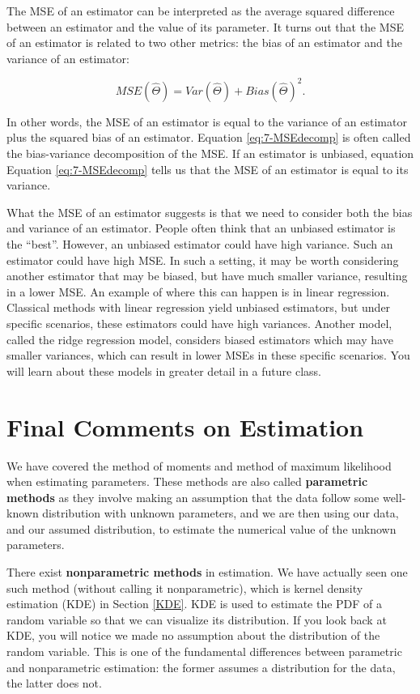 \documentclass[
]{book}
\begin{document}
The MSE of an estimator can be interpreted as the average squared difference between an estimator and the value of its parameter. It turns out that the MSE of an estimator is related to two other metrics: the bias of an estimator and the variance of an estimator:

\begin{equation} 
MSE(\hat{\Theta}) = Var(\hat{\Theta}) + Bias(\hat{\Theta})^2.
\label{eq:7-MSEdecomp}
\end{equation}

In other words, the MSE of an estimator is equal to the variance of an estimator plus the squared bias of an estimator. Equation \eqref{eq:7-MSEdecomp} is often called the bias-variance decomposition of the MSE. If an estimator is unbiased, equation Equation \eqref{eq:7-MSEdecomp} tells us that the MSE of an estimator is equal to its variance.

What the MSE of an estimator suggests is that we need to consider both the bias and variance of an estimator. People often think that an unbiased estimator is the ``best''. However, an unbiased estimator could have high variance. Such an estimator could have high MSE. In such a setting, it may be worth considering another estimator that may be biased, but have much smaller variance, resulting in a lower MSE. An example of where this can happen is in linear regression. Classical methods with linear regression yield unbiased estimators, but under specific scenarios, these estimators could have high variances. Another model, called the ridge regression model, considers biased estimators which may have smaller variances, which can result in lower MSEs in these specific scenarios. You will learn about these models in greater detail in a future class.

\hypertarget{estcomments}{%
\section{Final Comments on Estimation}\label{estcomments}}

We have covered the method of moments and method of maximum likelihood when estimating parameters. These methods are also called \textbf{parametric methods} as they involve making an assumption that the data follow some well-known distribution with unknown parameters, and we are then using our data, and our assumed distribution, to estimate the numerical value of the unknown parameters.

There exist \textbf{nonparametric methods} in estimation. We have actually seen one such method (without calling it nonparametric), which is kernel density estimation (KDE) in Section \ref{KDE}. KDE is used to estimate the PDF of a random variable so that we can visualize its distribution. If you look back at KDE, you will notice we made no assumption about the distribution of the random variable. This is one of the fundamental differences between parametric and nonparametric estimation: the former assumes a distribution for the data, the latter does not.
\end{document}
